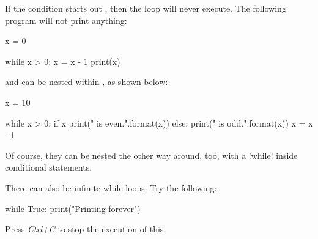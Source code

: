 \documentclass[11pt]{cselabheader}
\begin{document}
{If the condition starts out , then the loop will never execute.
The following program will not print anything:

\begin{python3code}
x = 0

while x > 0:
    x = x - 1
    print(x)
\end{python3code}

 and  can be nested within
, as shown below:

\begin{python3code}
x = 10

while x > 0:
    if x %
        print("{} is even.".format(x))
    else:
        print("{} is odd.".format(x))
    x = x - 1
\end{python3code}

Of course, they can be nested the other way around, too, with a
\pythoninline!while! inside conditional statements.

There can also be infinite while loops. Try the following:
\begin{python3code}
while True:
    print("Printing forever")
\end{python3code}

Press \emph{Ctrl+C} to stop the execution of this.

}
\end{document}
